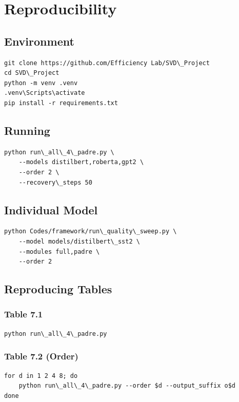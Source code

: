 \section{Reproducibility}

\subsection{Environment}

\begin{lstlisting}
git clone https://github.com/Efficiency Lab/SVD\_Project
cd SVD\_Project
python -m venv .venv
.venv\Scripts\activate
pip install -r requirements.txt
\end{lstlisting}

\subsection{Running}

\begin{lstlisting}
python run\_all\_4\_padre.py \
    --models distilbert,roberta,gpt2 \
    --order 2 \
    --recovery\_steps 50
\end{lstlisting}

\subsection{Individual Model}

\begin{lstlisting}
python Codes/framework/run\_quality\_sweep.py \
    --model models/distilbert\_sst2 \
    --modules full,padre \
    --order 2
\end{lstlisting}

\subsection{Reproducing Tables}

\subsubsection{Table 7.1}
\begin{lstlisting}
python run\_all\_4\_padre.py
\end{lstlisting}

\subsubsection{Table 7.2 (Order)}
\begin{lstlisting}
for d in 1 2 4 8; do
    python run\_all\_4\_padre.py --order $d --output_suffix o$d
done
\end{lstlisting}

